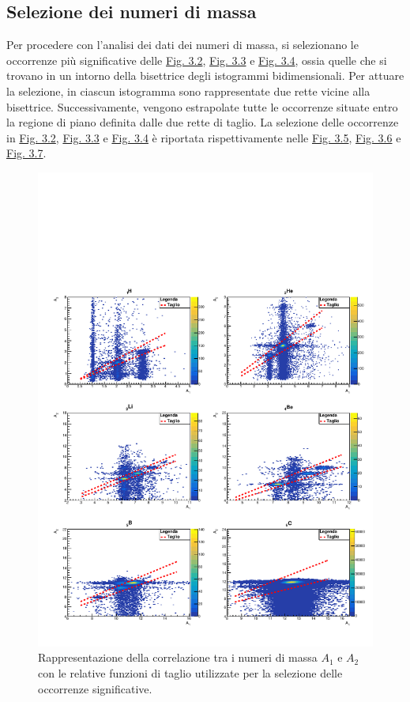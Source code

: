 \documentclass[12pt,a4paper,twoside]{report}
\begin{document}
	\subsection{Selezione dei numeri di massa}\label{sec:selection_number_of_mass}
	Per procedere con l'analisi dei dati dei numeri di massa, si selezionano le occorrenze più significative delle \hyperref[fig:a1]{Fig. 3.2}, \hyperref[fig:a2]{Fig. 3.3} e \hyperref[fig:a3]{Fig. 3.4}, ossia quelle che si trovano in un intorno della bisettrice degli istogrammi bidimensionali. Per attuare la selezione, in ciascun istogramma sono rappresentate due rette vicine alla bisettrice. Successivamente, vengono estrapolate tutte le occorrenze situate entro la regione di piano definita dalle due rette di taglio. La selezione delle occorrenze in \hyperref[fig:a1]{Fig. 3.2}, \hyperref[fig:a2]{Fig. 3.3} e \hyperref[fig:a3]{Fig. 3.4} è riportata rispettivamente nelle \hyperref[fig:a1_cut]{Fig. 3.5}, \hyperref[fig:a2_cut]{Fig. 3.6} e \hyperref[fig:a3_cut]{Fig. 3.7}.
	\begin{figure}[H]
		\centering
		\includegraphics[width=1.0\linewidth]{c_MultiCanvasCut1.pdf}
		\caption{Rappresentazione della correlazione tra i numeri di massa $A_1$ e $A_2$ con le relative funzioni di taglio utilizzate per la selezione delle occorrenze significative.}
		\label{fig:a1_cut}
	\end{figure}
\end{document}
